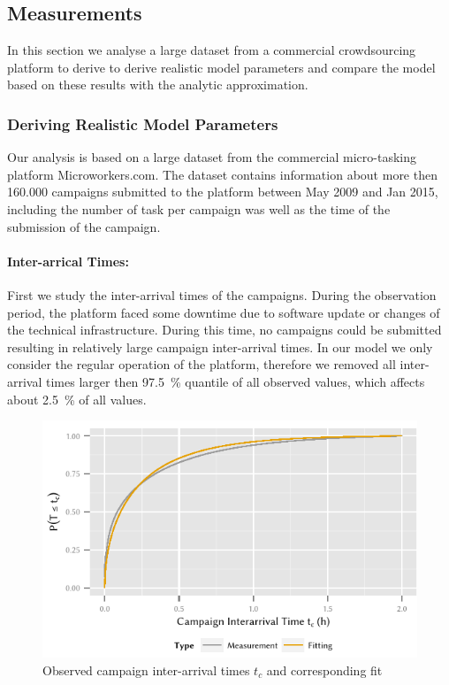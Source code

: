 \subsection{Measurements}\label{sec:cloud:crowdsourcing:measurements}
In this section we analyse a large dataset from a commercial crowdsourcing platform to derive to derive realistic model parameters and compare the model based on these results with the analytic approximation.

\subsubsection*{Deriving Realistic Model Parameters}
Our analysis is based on a large dataset from the commercial micro-tasking platform Microworkers.com.
The dataset contains information about more then 160.000 campaigns submitted to the platform between May 2009 and Jan 2015, including the number of task per campaign was well as the time of the submission of the campaign.  

\paragraph*{Inter-arrical Times:} First we study the inter-arrival times of the campaigns.
During the observation period, the platform faced some downtime due to software update or changes of the technical infrastructure.
During this time, no campaigns could be submitted resulting in relatively large campaign inter-arrival times.
In our model we only consider the regular operation of the platform, therefore we removed all inter-arrival times larger then \SI{97.5}{\percent} quantile of all observed values, which affects about \SI{2.5}{\percent} of all values.

\begin{figure}
  \centering
  \includegraphics{cloud/crowdsourcing/measurements/figures/campaign_interarrival}
  \caption{Observed campaign inter-arrival times \(t_c\) and corresponding fit}
  \label{fig:cloud:crowdsourcing:measurements:parameters:campaign_interarrival}
\end{figure}

